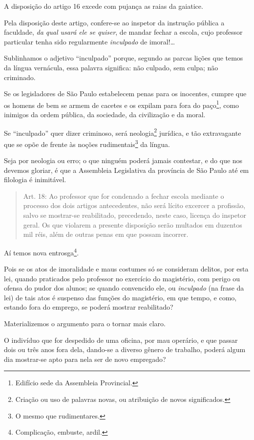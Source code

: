 A disposição do artigo 16 excede com pujança as raias da gaiatice.

Pela disposição deste artigo, confere-se ao inspetor da instrução
pública a faculdade, \emph{da qual usará ele se quiser}, de mandar
fechar a escola, cujo professor particular tenha sido regularmente
\emph{inculpado} de imoral!\ldots{}

Sublinhamos o adjetivo ``inculpado'' porque, segundo as parcas lições que
temos da língua vernácula, essa palavra significa: não culpado, sem
culpa; não criminado.

Se os legisladores de São Paulo estabelecem penas para os inocentes,
cumpre que os homens de bem se armem de cacetes e os expilam para fora
do paço\footnote{Edifício sede da Assembleia Provincial.}, como
inimigos da ordem pública, da sociedade, da civilização e da moral.

Se ``inculpado'' quer dizer criminoso, será neologia\footnote{Criação ou
  uso de palavras novas, ou atribuição de novos significados.} jurídica,
e tão extravagante que se opõe de frente às noções
rudimentais\footnote{O mesmo que rudimentares.} da língua.

Seja por neologia ou erro; o que ninguém poderá jamais contestar, e do
que nos devemos gloriar, é que a Assembleia Legislativa da província de
São Paulo até em filologia é inimitável.

\begin{quote}
Art. 18: Ao professor que for condenado a fechar escola mediante o
processo dos dois artigos antecedentes, não será lícito excercer a
profissão, salvo se mostrar-se reabilitado, precedendo, neste caso,
licença do inspetor geral. Os que violarem a presente disposição serão
multados em duzentos mil réis, além de outras penas em que possam
incorrer.
\end{quote}

Aí temos nova entrosga\footnote{Complicação, embuste, ardil.}.

Pois se os atos de imoralidade e maus costumes só se consideram delitos,
por esta lei, quando praticados pelo professor no exercício do
magistério, com perigo ou ofensa do pudor dos alunos; se quando
convencido ele, ou \emph{inculpado} (na frase da lei) de tais atos é
suspenso das funções do magistério, em que tempo, e como, estando fora
do emprego, se poderá mostrar reabilitado?

Materializemos o argumento para o tornar mais claro.

O indivíduo que for despedido de uma oficina, por mau operário, e que
passar dois ou três anos fora dela, dando-se a diverso gênero de
trabalho, poderá algum dia mostrar-se apto para nela ser de novo
empregado?

